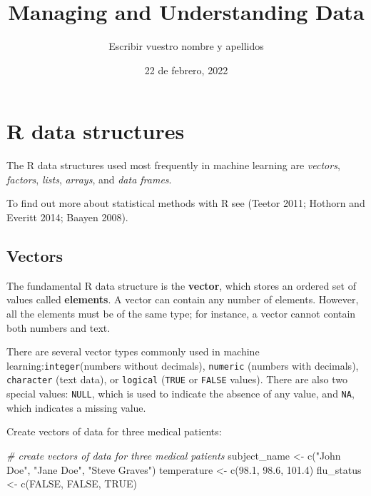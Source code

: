 \documentclass[
]{article}
\title{Managing and Understanding Data}
\author{Escribir vuestro nombre y apellidos}
\date{22 de febrero, 2022}
\newenvironment{Shaded}{\begin{snugshade}}{\end{snugshade}}
\newcommand{\CommentTok}[1]{\textcolor[rgb]{0.56,0.35,0.01}{\textit{#1}}}
\newcommand{\ConstantTok}[1]{\textcolor[rgb]{0.00,0.00,0.00}{#1}}
\newcommand{\FloatTok}[1]{\textcolor[rgb]{0.00,0.00,0.81}{#1}}
\newcommand{\FunctionTok}[1]{\textcolor[rgb]{0.00,0.00,0.00}{#1}}
\newcommand{\NormalTok}[1]{#1}
\newcommand{\OtherTok}[1]{\textcolor[rgb]{0.56,0.35,0.01}{#1}}
\newcommand{\StringTok}[1]{\textcolor[rgb]{0.31,0.60,0.02}{#1}}
\begin{document}
\maketitle

{
\setcounter{tocdepth}{2}
\tableofcontents
}
\hypertarget{r-data-structures}{%
\section{R data structures}\label{r-data-structures}}

The R data structures used most frequently in machine learning are
\emph{vectors}, \emph{factors}, \emph{lists}, \emph{arrays}, and
\emph{data frames}.

To find out more about statistical methods with R see (Teetor 2011;
Hothorn and Everitt 2014; Baayen 2008).

\hypertarget{vectors}{%
\subsection{Vectors}\label{vectors}}

The fundamental R data structure is the \textbf{vector}, which stores an
ordered set of values called \textbf{elements}. A vector can contain any
number of elements. However, all the elements must be of the same type;
for instance, a vector cannot contain both numbers and text.

There are several vector types commonly used in machine
learning:\texttt{integer}(numbers without decimals), \texttt{numeric}
(numbers with decimals), \texttt{character} (text data), or
\texttt{logical} (\texttt{TRUE} or \texttt{FALSE} values). There are
also two special values: \texttt{NULL}, which is used to indicate the
absence of any value, and \texttt{NA}, which indicates a missing value.

Create vectors of data for three medical patients:

\begin{Shaded}
\begin{Highlighting}[]
\CommentTok{\# create vectors of data for three medical patients}
\NormalTok{subject\_name }\OtherTok{\textless{}{-}} \FunctionTok{c}\NormalTok{(}\StringTok{"John Doe"}\NormalTok{, }\StringTok{"Jane Doe"}\NormalTok{, }\StringTok{"Steve Graves"}\NormalTok{)}
\NormalTok{temperature }\OtherTok{\textless{}{-}} \FunctionTok{c}\NormalTok{(}\FloatTok{98.1}\NormalTok{, }\FloatTok{98.6}\NormalTok{, }\FloatTok{101.4}\NormalTok{)}
\NormalTok{flu\_status }\OtherTok{\textless{}{-}} \FunctionTok{c}\NormalTok{(}\ConstantTok{FALSE}\NormalTok{, }\ConstantTok{FALSE}\NormalTok{, }\ConstantTok{TRUE}\NormalTok{)}
\end{Highlighting}
\end{Shaded}
\end{document}
